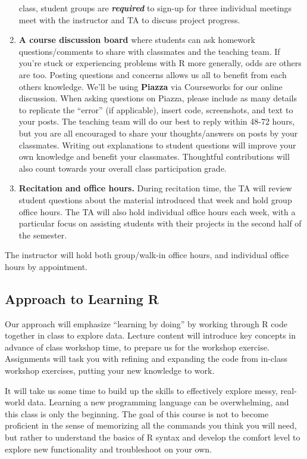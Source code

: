 \documentclass[11pt,]{article}
\begin{document}
\begin{enumerate}
  class, student groups are \emph{\textbf{required}} to sign-up for
  three individual meetings meet with the instructor and TA to discuss
  project progress.
\item
  \textbf{A course discussion board} where students can ask homework
  questions/comments to share with classmates and the teaching team. If
  you're stuck or experiencing problems with R more generally, odds are
  others are too. Posting questions and concerns allows us all to
  benefit from each others knowledge. We'll be using \textbf{Piazza} via
  Courseworks for our online discussion. When asking questions on
  Piazza, please include as many details to replicate the ``error'' (if
  applicable), insert code, screenshots, and text to your posts. The
  teaching team will do our best to reply within 48-72 hours, but you
  are all encouraged to share your thoughts/answers on posts by your
  classmates. Writing out explanations to student questions will improve
  your own knowledge and benefit your classmates. Thoughtful
  contributions will also count towards your overall class participation
  grade.
\item
  \textbf{Recitation and office hours.} During recitation time, the TA
  will review student questions about the material introduced that week
  and hold group office hours. The TA will also hold individual office
  hours each week, with a particular focus on assisting students with
  their projects in the second half of the semester.
\end{enumerate}

The instructor will hold both group/walk-in office hours, and individual
office hours by appointment.

\hypertarget{approach-to-learning-r}{%
\subsection{Approach to Learning R}\label{approach-to-learning-r}}

Our approach will emphasize ``learning by doing'' by working through R
code together in class to explore data. Lecture content will introduce
key concepts in advance of class workshop time, to prepare us for the
workshop exercise. Assignments will task you with refining and expanding
the code from in-class workshop exercises, putting your new knowledge to
work.

It will take us some time to build up the skills to effectively explore
messy, real-world data. Learning a new programming language can be
overwhelming, and this class is only the beginning. The goal of this
course is not to become proficient in the sense of memorizing all the
commands you think you will need, but rather to understand the basics of
R syntax and develop the comfort level to explore new functionality and
troubleshoot on your own.
\end{document}
